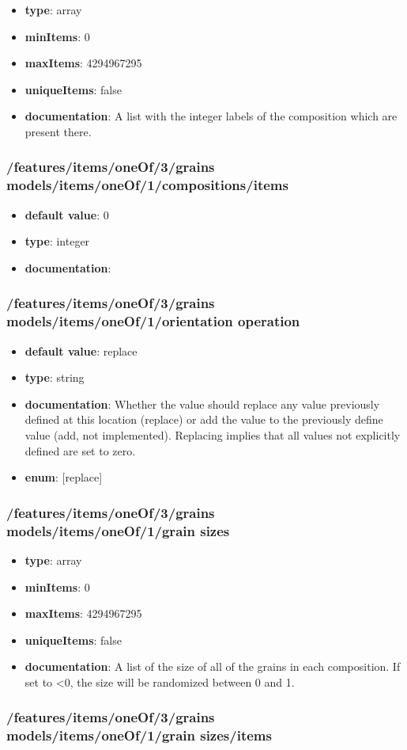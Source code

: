 \begin{itemize}\item {\bf type}: array
\item {\bf minItems}: 0
\item {\bf maxItems}: 4294967295
\item {\bf uniqueItems}: false
\item {\bf documentation}: A list with the integer labels of the composition which are present there.
\end{itemize}\subsubsection{/features/items/oneOf/3/grains models/items/oneOf/1/compositions/items}
\begin{itemize}\item {\bf default value}: 0
\item {\bf type}: integer
\item {\bf documentation}: 
\end{itemize}\subsubsection{/features/items/oneOf/3/grains models/items/oneOf/1/orientation operation}
\begin{itemize}\item {\bf default value}: replace
\item {\bf type}: string
\item {\bf documentation}: Whether the value should replace any value previously defined at this location (replace) or add the value to the previously define value (add, not implemented). Replacing implies that all values not explicitly defined are set to zero.
\item {\bf enum}: [replace]\end{itemize}\subsubsection{/features/items/oneOf/3/grains models/items/oneOf/1/grain sizes}
\begin{itemize}\item {\bf type}: array
\item {\bf minItems}: 0
\item {\bf maxItems}: 4294967295
\item {\bf uniqueItems}: false
\item {\bf documentation}: A list of the size of all of the grains in each composition. If set to <0, the size will be randomized between 0 and 1.
\end{itemize}\subsubsection{/features/items/oneOf/3/grains models/items/oneOf/1/grain sizes/items}
